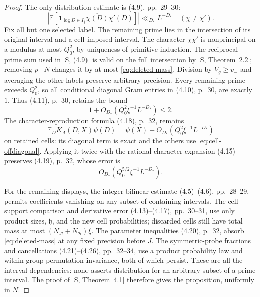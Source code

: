 \documentclass[11pt]{article}
\theoremstyle{definition}
\newcommand{\E}{\mathbb E}
\newcommand{\ind}{\mathbf 1}
\theoremstyle{remark}
\begin{document}
\begin{proof}
The only distribution estimate is (4.9), pp.~29--30:
\begin{equation}\label{eq:cell-offdiagonal}
\left|\E\left[\ind_{\log D\in I_j}
                  \overline{\chi(D)}\chi'(D)\right]\right|
\ll_{D_*} L^{-D_*}\quad(\chi\ne\chi').
\end{equation}
Fix all but one selected label. The remaining prime lies in the
intersection of its original interval and a cell-imposed interval.
The character $\overline\chi\chi'$ is nonprincipal on a modulus
at most $Q_0^2$, by uniqueness of primitive induction.
The reciprocal prime sum used in [S, (4.9)] is valid on the full
intersection by [S, Theorem~2.2]; removing $p\mid N$ changes it
by at most \eqref{eq:deleted-mass}. Division by $V_g\ge v_-$
and averaging the other labels preserve arbitrary precision.
Every remaining prime exceeds $Q_0^2$, so all conditional diagonal
Gram entries in (4.10), p.~30, are exactly $1$.
Thus (4.11), p.~30, retains the bound
\begin{equation}\label{eq:gram-bound}
1+O_{D_*}(Q_0^2\xi^{-1}L^{-D_*})\le2.
\end{equation}
The character-reproduction formula (4.18), p.~32, remains
\begin{equation}\label{eq:character-reproduction}
\E_D K_\Lambda(D,X)\psi(D)
=\psi(X)+O_{D_*}(Q_0^2\xi^{-1}L^{-D_*})
\end{equation}
on retained cells: its diagonal term is exact and the others use
\eqref{eq:cell-offdiagonal}. Applying it twice with the rational
character expansion (4.15) preserves (4.19), p.~32, whose error is
\begin{equation}\label{eq:rational-reproduction}
O_{D_*}(Q_0^{5/2}\xi^{-1}L^{-D_*}).
\end{equation}

For the remaining displays, the integer bilinear estimate (4.5)--(4.6),
pp.~28--29, permits coefficients vanishing on any subset of containing
intervals. The cell support comparison and derivative error
(4.13)--(4.17), pp.~30--31, use only product sizes,
$\mathfrak h$, and the new cell probabilities; discarded cells still
have total mass at most $(N_{\mathcal A}+N_{\mathcal B})\xi$.
The parameter inequalities (4.20), p.~32, absorb
\eqref{eq:deleted-mass} at any fixed precision before $J$.
The symmetric-probe fractions and cancellations
(4.21)--(4.26), pp.~32--34, use a product probability law and
within-group permutation invariance, both of which persist.
These are all the interval dependencies: none asserts distribution
for an arbitrary subset of a prime interval. The proof of [S,
Theorem~4.1] therefore gives the proposition, uniformly in $N$.
\end{proof}
\end{document}
